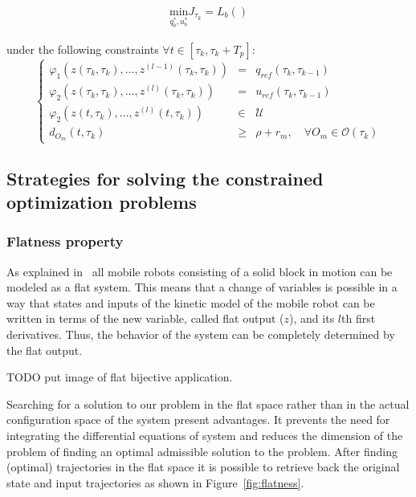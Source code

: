 \documentclass[eprint]{actapoly}
\begin{document}
\begin{align}
\underset{q^*_b,u^*_b}{\mathrm{min}} J_{\tau_k} =
L_b()
\end{align}

under the following constraints $\forall t \in [\tau_k, \tau_k+T_p]$:
\begin{equation}%
\left\lbrace\begin{array}{lcl}
	\varphi_1(z(\tau_{k},\tau_{k}),\dotsc,z^{(l-1)}(\tau_k,\tau_k)) & = &  q_{ref}(\tau_k,\tau_{k-1})\\
    \varphi_2(z(\tau_{k},\tau_{k}),\dotsc,z^{(l)}(\tau_k,\tau_k)) & = & u_{ref}(\tau_k,\tau_{k-1})\\
    \varphi_2(z(t,\tau_k),\dotsc,z^{(l)}(t,\tau_k)) &\in& \mathcal{U}\\
    d_{O_m}(t,\tau_k) &\geq& \rho + r_m,\quad \forall O_m \in \mathcal{O}(\tau_k)
\end{array}\right.
\end{equation}



\subsection{Strategies for solving the constrained optimization problems}



\subsubsection{Flatness property}

As explained in~\cite{Defoort2007a} all mobile robots consisting of a solid
block in motion can be modeled as a flat system. 
This means that a change of variables is possible in a way that states and
inputs of the kinetic model of the mobile robot can be written in terms
of the new variable, called flat output ($z$), and its $l$th first derivatives.
Thus, the behavior of the system can be completely determined by the flat
output.

TODO put image of flat bijective application.

Searching for a solution to our problem in the flat space rather than in
the actual configuration space of the system present advantages.
It prevents the need for integrating the differential equations
of system and reduces the dimension of the problem of finding an optimal
admissible solution to the problem.
After finding (optimal) trajectories in the flat space it is possible
to retrieve back the original state and input trajectories as shown in
Figure~\ref{fig:flatness}.
\end{document}
